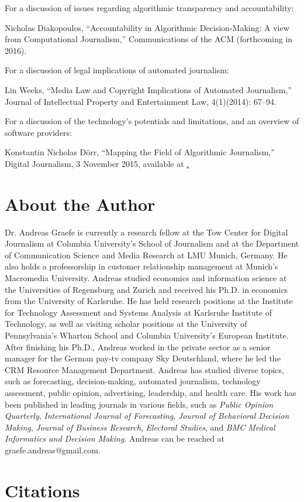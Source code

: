 \documentclass[notoc, symmetric, nobib, nols]{towcenter-guideto-book}
\newcommand{\blankpage}{\newpage\hbox{}\thispagestyle{empty}\newpage}
\begin{document}
For a discussion of issues regarding algorithmic transparency and accountability:

Nicholas Diakopoulos, ``Accountability in Algorithmic Decision-Making: A view from Computational Journalism,'' Communications of the ACM (forthcoming in 2016).   

For a discussion of legal implications of automated journalism:

Lin Weeks, ``Media Law and Copyright Implications of Automated Journalism,'' Journal of Intellectual Property and Entertainment Law, 4(1)(2014): 67--94.

For a discussion of the technology's potentials and limitations, and an overview of software providers:

Konstantin Nicholas Dörr, ``Mapping the Field of Algorithmic Journalism,'' Digital Journalism, 3 November 2015, available at \href{http://www.tandfonline.com/doi/abs/10.1080/21670811.2015.1096748?journalCode=rdij20}.

\chapter{About the Author}

Dr. Andreas Graefe is currently a research fellow at the Tow Center for Digital Journalism at Columbia University's School of Journalism and at the Department of Communication Science and Media Research at LMU Munich, Germany. He also holds a professorship in customer relationship management at Munich's Macromedia University. Andreas studied economics and information science at the Universities of Regensburg and Zurich and received his Ph.D. in economics from the University of Karlsruhe. He has held research positions at the Institute for Technology Assessment and Systems Analysis at Karlsruhe Institute of Technology, as well as visiting scholar positions at the University of Pennsylvania's Wharton School and Columbia University's European Institute. After finishing his Ph.D., Andreas worked in the private sector as a senior manager for the German pay-tv company Sky Deutschland, where he led the CRM Resource Management Department. Andreas has studied diverse topics, such as forecasting, decision-making, automated journalism, technology assessment, public opinion, advertising, leadership, and health care. His work has been published in leading journals in various fields, such as \textit{Public Opinion Quarterly}, \textit{International Journal of Forecasting}, \textit{Journal of Behavioral Decision Making}, \textit{Journal of Business Research}, \textit{Electoral Studies}, and \textit{BMC Medical Informatics and Decision Making}. Andreas can be reached at graefe.andreas@gmail.com.

\chapter{Citations}
\blankpage
\theendnotes
\end{document}
